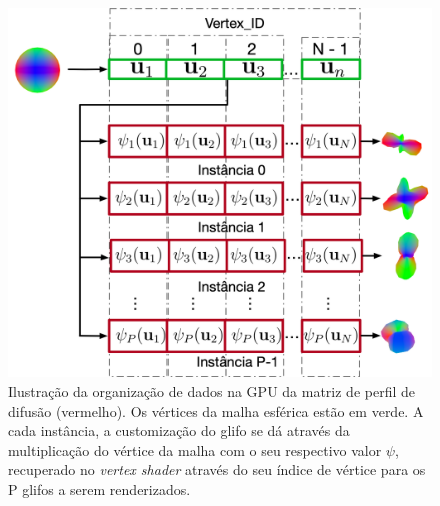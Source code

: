 \documentclass[
    12pt,                %
    oneside,            %
    a4paper,            %
    english,            %
    french,                %
    spanish,            %
    brazil                %
    ]{abntex2}
\begin{document}
\begin{figure}[h]
    \centering
    \includegraphics[width=1.0\linewidth, angle=0]{figs/Esquema_Glifo/GPU2GlifoGeneral.png}
    \caption{Ilustração da organização de dados na GPU da matriz de perfil de difusão (vermelho). Os vértices da malha esférica estão em verde. A cada instância, a customização do glifo se dá através da multiplicação do vértice da malha com o seu respectivo valor $\psi$, recuperado no \textit{vertex shader} através do seu índice de vértice para os P glifos a serem renderizados.}
    \label{fig::GPU2glifoGeneral}
   \hspace{1pt}
\end{figure}



\end{document}
